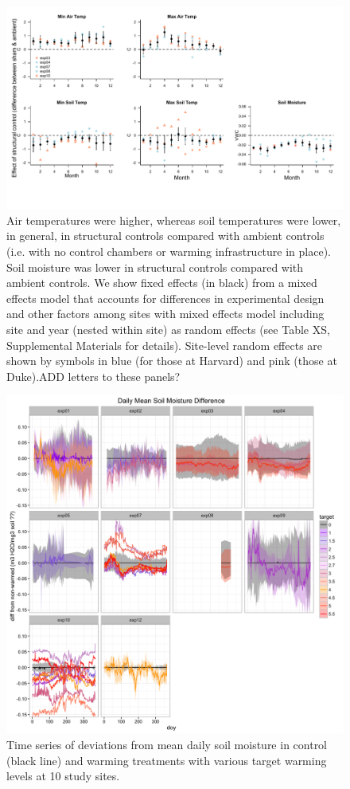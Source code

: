 \documentclass{article}
\begin{document}
 \begin{figure}[p]
\centering
 \includegraphics{../Analyses/figures/ShamVSAmbient_all.pdf}  
 \caption{Air temperatures were higher, whereas soil temperatures were lower, in general, in structural controls compared with ambient controls (i.e. with no control chambers or warming infrastructure in place). Soil moisture was lower in structural controls compared with ambient controls. We show fixed effects (in black) from a mixed effects model that accounts for differences in experimental design and other factors among sites with mixed effects model including site and year (nested within site) as random effects (see Table XS, Supplemental Materials for details). Site-level random effects are shown by symbols in blue (for those at Harvard) and pink (those at Duke).ADD letters to these panels?}
 \label{fig:shamamb}
 \end{figure}
\clearpage
 \begin{figure}[h]
    \centering
 \includegraphics{../Analyses/figures/Exploratory_TimeSeries_SoilMoist_Deviation.png}  
 \caption{Time series of deviations from mean daily soil moisture in control (black line) and warming treatments with various target warming levels at 10 study sites.}
 \label{fig:mois}
 \end{figure}
\end{document}
